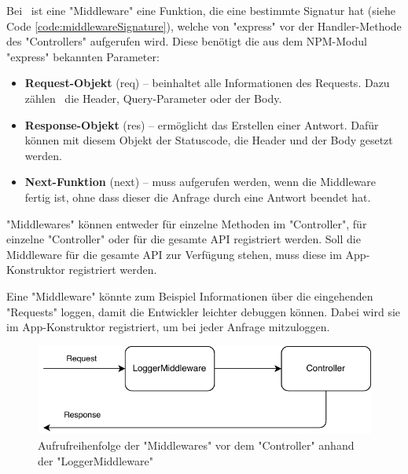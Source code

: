 \label{sec:middleware}

Bei \ZELIA\ ist eine "Middleware" eine Funktion, die eine bestimmte Signatur hat (siehe Code \ref{code:middlewareSignature}), welche von "express" vor der Handler-Methode des "Controllers" aufgerufen wird. 
Diese benötigt die aus dem NPM-Modul "express" bekannten Parameter:

\begin{itemize}
    \item \textbf{Request-Objekt} ({\ttfamily req}) -- beinhaltet alle Informationen des Requests. Dazu zählen \zb\ die Header, Query-Parameter oder der Body.
    \item \textbf{Response-Objekt} ({\ttfamily res}) -- ermöglicht das Erstellen einer Antwort. Dafür können mit diesem Objekt der Statuscode, die Header und der Body gesetzt werden.
    \item \textbf{Next-Funktion} ({\ttfamily next}) -- muss aufgerufen werden, wenn die Middleware fertig ist, ohne dass dieser die Anfrage durch eine Antwort beendet hat.
\end{itemize}

"Middlewares" können entweder für einzelne Methoden im "Controller", für einzelne "Controller" oder für die gesamte API registriert werden. Soll die Middleware für die gesamte API zur Verfügung stehen, muss diese im App-Konstruktor registriert werden.



Eine "Middleware" könnte zum Beispiel Informationen über die eingehenden "Requests" loggen, damit die Entwickler leichter debuggen können. 
Dabei wird sie im App-Kon\-struk\-tor registriert, um bei jeder Anfrage mitzuloggen. 

\begin{figure}[H]
    \centering
    \includegraphics{media/APITemplate/LogMiddleware.svg.pdf}
    \caption{Aufrufreihenfolge der "Middlewares" vor dem "Controller" anhand der "LoggerMiddleware"} 
\end{figure}

